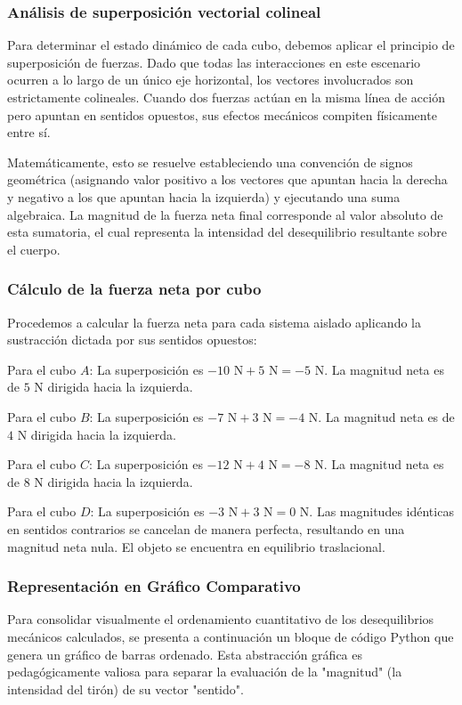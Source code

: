\documentclass[12pt, a4paper]{article}
\begin{document}
\subsubsection*{Análisis de superposición vectorial colineal}
Para determinar el estado dinámico de cada cubo, debemos aplicar el principio de superposición de fuerzas. Dado que todas las interacciones en este escenario ocurren a lo largo de un único eje horizontal, los vectores involucrados son estrictamente colineales. Cuando dos fuerzas actúan en la misma línea de acción pero apuntan en sentidos opuestos, sus efectos mecánicos compiten físicamente entre sí. 

Matemáticamente, esto se resuelve estableciendo una convención de signos geométrica (asignando valor positivo a los vectores que apuntan hacia la derecha y negativo a los que apuntan hacia la izquierda) y ejecutando una suma algebraica. La magnitud de la fuerza neta final corresponde al valor absoluto de esta sumatoria, el cual representa la intensidad del desequilibrio resultante sobre el cuerpo.

\subsubsection*{Cálculo de la fuerza neta por cubo}
Procedemos a calcular la fuerza neta para cada sistema aislado aplicando la sustracción dictada por sus sentidos opuestos:

Para el cubo $A$: La superposición es $-10 \text{ N} + 5 \text{ N} = -5 \text{ N}$. La magnitud neta es de $5 \text{ N}$ dirigida hacia la izquierda.

Para el cubo $B$: La superposición es $-7 \text{ N} + 3 \text{ N} = -4 \text{ N}$. La magnitud neta es de $4 \text{ N}$ dirigida hacia la izquierda.

Para el cubo $C$: La superposición es $-12 \text{ N} + 4 \text{ N} = -8 \text{ N}$. La magnitud neta es de $8 \text{ N}$ dirigida hacia la izquierda.

Para el cubo $D$: La superposición es $-3 \text{ N} + 3 \text{ N} = 0 \text{ N}$. Las magnitudes idénticas en sentidos contrarios se cancelan de manera perfecta, resultando en una magnitud neta nula. El objeto se encuentra en equilibrio traslacional.

\subsubsection*{Representación en Gráfico Comparativo}
Para consolidar visualmente el ordenamiento cuantitativo de los desequilibrios mecánicos calculados, se presenta a continuación un bloque de código Python que genera un gráfico de barras ordenado. Esta abstracción gráfica es pedagógicamente valiosa para separar la evaluación de la "magnitud" (la intensidad del tirón) de su vector "sentido".
\end{document}
